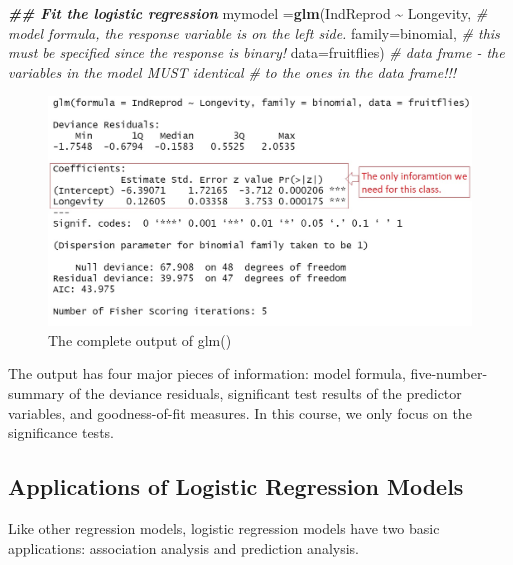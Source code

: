 \documentclass[
]{book}
\newenvironment{Shaded}{\begin{snugshade}}{\end{snugshade}}
\newcommand{\AttributeTok}[1]{\textcolor[rgb]{0.13,0.29,0.53}{#1}}
\newcommand{\CommentTok}[1]{\textcolor[rgb]{0.56,0.35,0.01}{\textit{#1}}}
\newcommand{\DocumentationTok}[1]{\textcolor[rgb]{0.56,0.35,0.01}{\textbf{\textit{#1}}}}
\newcommand{\FunctionTok}[1]{\textcolor[rgb]{0.13,0.29,0.53}{\textbf{#1}}}
\newcommand{\NormalTok}[1]{#1}
\newcommand{\OtherTok}[1]{\textcolor[rgb]{0.56,0.35,0.01}{#1}}
\newcommand{\SpecialCharTok}[1]{\textcolor[rgb]{0.81,0.36,0.00}{\textbf{#1}}}
\begin{document}
\begin{Shaded}
\begin{Highlighting}[]
\DocumentationTok{\#\# Fit the logistic regression}
\NormalTok{mymodel }\OtherTok{=}\FunctionTok{glm}\NormalTok{(IndReprod }\SpecialCharTok{\textasciitilde{}}\NormalTok{ Longevity,   }\CommentTok{\# model formula, the response variable is on the left side.}
          \AttributeTok{family=}\NormalTok{binomial,            }\CommentTok{\# this must be specified since the response is binary!}
          \AttributeTok{data=}\NormalTok{fruitflies)            }\CommentTok{\# data frame {-} the variables in the model MUST identical}
                                      \CommentTok{\# to the ones in the data frame!!!}
\end{Highlighting}
\end{Shaded}

\begin{figure}

{\centering \includegraphics[width=0.8\linewidth]{img04/w04-glm-output} 

}

\caption{The complete output of glm()}\label{fig:unnamed-chunk-93}
\end{figure}

The output has four major pieces of information: model formula, five-number-summary of the deviance residuals, significant test results of the predictor variables, and goodness-of-fit measures. In this course, we only focus on the significance tests.

\hypertarget{applications-of-logistic-regression-models}{%
\subsection{Applications of Logistic Regression Models}\label{applications-of-logistic-regression-models}}

Like other regression models, logistic regression models have two basic applications: association analysis and prediction analysis.
\end{document}
